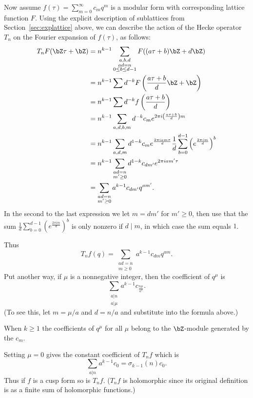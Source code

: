 \documentclass{report}
\begin{document}
Now assume $f(\tau)=\sum_{m=0}^{\infty} c_m q^m$ is a modular form
with corresponding lattice function $F$.  Using the explicit
description of sublattices from Section~\ref{sec:explattice}
above, we can describe the action of the Hecke operator $T_n$ on
the Fourier expansion of $f(\tau)$, as follows:
\begin{align*}
T_nF(\bZ\tau+\bZ) & =  n^{k-1}\sum_{\substack{a,b,d\\ ad=n\\ 0\leq
b\leq d-1}}
F((a\tau+b)\bZ + d\bZ)\\
& = n^{k-1}\sum d^{-k} F\left(\frac{a\tau+b}{d}\bZ+\bZ\right)\\
& = n^{k-1}\sum d^{-k} f\left(\frac{a\tau+b}{d}\right)\\
& = n^{k-1}\sum_{a,d,b,m} d^{-k}c_m e^{2\pi i\left(\frac{a\tau+b}{d}\right)m}\\
& = n^{k-1}\sum_{a,d,m} d^{1-k}c_m e^{\frac{2\pi i a m \tau}{d}}
\frac{1}{d}\sum_{b=0}^{d-1} \left(e^{\frac{2\pi i m}{d}}\right)^b\\
& = n^{k-1}\sum_{\substack{ad=n\\m'\geq 0}}d^{1-k} c_{dm'}e^{2\pi i a m' \tau}\\
& = \sum_{\substack{ad=n\\m'\geq 0}} a^{k-1} c_{dm'}q^{am'}.
\end{align*}
In the second to the last expression we let $m=dm'$ for $m'\geq
0$, then use that the sum $\frac{1}{d}\sum_{b=0}^{d-1}
(e^{\frac{2\pi i m}{d}})^b$ is only nonzero if $d\mid{}m$,
in which case the sum equals $1$.

Thus
$$T_nf(q)=\sum_{\substack{ad=n\\m\geq 0}} a^{k-1}c_{dm} q^{am}.$$
Put another way, if $\mu$ is a nonnegative integer, then the
coefficient of $q^{\mu}$ is
\[
  \sum_{\substack{a|n\\ a|\mu}}a^{k-1}c_{\frac{n\mu}{a^2}}.
\]
(To see this, let $m=\mu/a$ and $d=n/a$ and substitute into the
formula above.)

\begin{remark}\label{rmk:level1rat}
When $k\geq 1$ the coefficients of $q^{\mu}$ for all $\mu$ belong
to the $\bZ$-module generated by the $c_m$.
\end{remark}

\begin{remark}
Setting $\mu=0$ gives the constant coefficient of $T_n f$ which is
$$\sum_{a|n}a^{k-1}c_0 = \sigma_{k-1}(n)c_0.$$
Thus if $f$ is a cusp form so is $T_nf$. ($T_nf$ is holomorphic
since its original definition is as a finite sum of holomorphic
functions.)
\end{remark}
\end{document}

